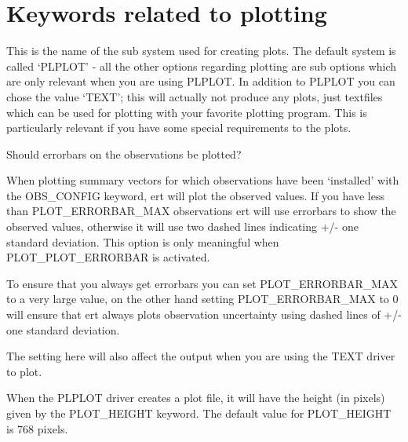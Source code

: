 \documentclass[a4paper,10pt,english]{sphinxmanual}
\begin{document}
\section{Keywords related to plotting}
\label{\detokenize{keywords/index:keywords-related-to-plotting}}\label{\detokenize{keywords/index:id16}}\label{\detokenize{keywords/index:plot-driver}}
\begin{sphinxShadowBox}

This is the name of the sub system used for creating plots. The default system
is called ‘PLPLOT’ - all the other options regarding plotting are sub options
which are only relevant when you are using PLPLOT. In addition to PLPLOT you
can chose the value ‘TEXT’; this will actually not produce any plots, just
textfiles which can be used for plotting with your favorite plotting program.
This is particularly relevant if you have some special requirements to the
plots.
\end{sphinxShadowBox}
\label{\detokenize{keywords/index:plot-errorbar}}
\begin{sphinxShadowBox}

Should errorbars on the observations be plotted?
\end{sphinxShadowBox}
\label{\detokenize{keywords/index:plot-errorbar-max}}
\begin{sphinxShadowBox}

When plotting summary vectors for which observations have been ‘installed’
with the OBS\_CONFIG keyword, ert will plot the observed values. If you have
less than PLOT\_ERRORBAR\_MAX observations ert will use errorbars to show the
observed values, otherwise it will use two dashed lines indicating +/- one
standard deviation. This option is only meaningful when PLOT\_PLOT\_ERRORBAR is
activated.

To ensure that you always get errorbars you can set PLOT\_ERRORBAR\_MAX to a
very large value, on the other hand setting PLOT\_ERRORBAR\_MAX to 0 will ensure
that ert always plots observation uncertainty using dashed lines of +/- one
standard deviation.

The setting here will also affect the output when you are using the TEXT
driver to plot.
\end{sphinxShadowBox}
\label{\detokenize{keywords/index:plot-height}}
\begin{sphinxShadowBox}

When the PLPLOT driver creates a plot file, it will have the height (in
pixels) given by the PLOT\_HEIGHT keyword. The default value for PLOT\_HEIGHT is
768 pixels.
\end{sphinxShadowBox}
\end{document}

